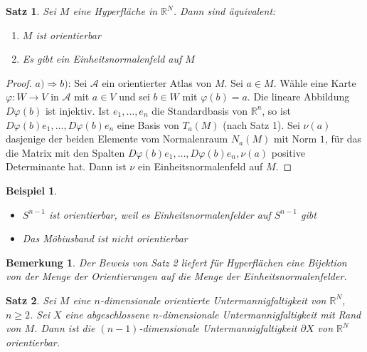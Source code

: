 \documentclass[10pt,a4paper]{report}
\newtheorem{satz}{Satz}
\newtheorem*{remark}{Bemerkung}
\newtheorem*{example}{Beispiel}
\begin{document}
\begin{satz}
  Sei $M$ eine Hyperfläche in $\mathbb{R}^{N}$.
  Dann sind äquivalent:
  \begin{enumerate}[label={\alph*)}]
  \item $M$ ist orientierbar
  \item Es gibt ein Einheitsnormalenfeld auf $M$
  \end{enumerate}
\end{satz}

\begin{proof}
  $a) \Rightarrow b)$: Sei $\mathscr{A}$ ein orientierter Atlas von $M$.
  Sei $a \in M$.
  Wähle eine Karte $\varphi : W \rightarrow V$ in $\mathscr{A}$ mit $a \in V$ und sei $b \in W$ mit $\varphi(b) = a$.
  Die lineare Abbildung $D\varphi(b)$ ist injektiv.
  Ist $e_{1}, \dots, e_{n}$ die Standardbasis von $\mathbb{R}^{n}$, so ist $D\varphi(b)e_{1}, \dots, D\varphi(b)e_{n}$ eine Basis von $T_{a}(M)$ (nach Satz 1).
  Sei $\nu(a)$ dasjenige der beiden Elemente vom Normalenraum $N_{a}(M)$ mit Norm $1$, für das die Matrix mit den Spalten $D\varphi(b)e_{1}, \dots, D\varphi(b)e_{n}, \nu(a)$ positive Determinante hat.
  Dann ist $\nu$ ein Einheitsnormalenfeld auf $M$.
\end{proof}

\begin{example}
  \begin{itemize}
  \item $S^{n - 1}$ ist orientierbar, weil es Einheitsnormalenfelder auf $S^{n - 1}$ gibt
  \item Das Möbiusband ist nicht orientierbar
  \end{itemize}
\end{example}

\begin{remark}
  Der Beweis von Satz 2 liefert für Hyperflächen eine Bijektion von der Menge der Orientierungen auf die Menge der Einheitsnormalenfelder.
\end{remark}

\begin{satz}
  Sei $M$ eine $n$-dimensionale orientierte Untermannigfaltigkeit von $\mathbb{R}^{N}$, $n \ge 2$.
  Sei $X$ eine abgeschlossene $n$-dimensionale Untermannigfaltigkeit mit Rand von $M$.
  Dann ist die $(n - 1)$-dimensionale Untermannigfaltigkeit $\partial X$ von $\mathbb{R}^{N}$ orientierbar.
\end{satz}
\end{document}
